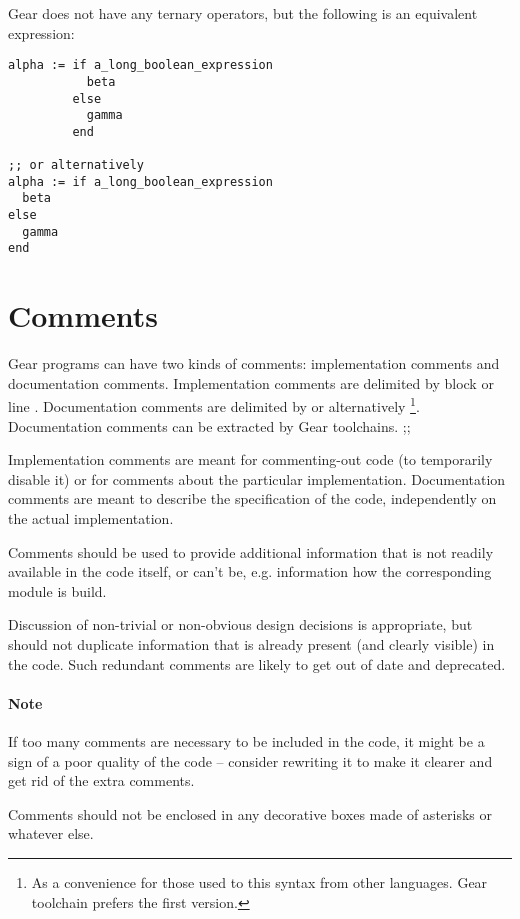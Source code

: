 \example Gear does not have any ternary operators, but the following is an equivalent expression:

\begin{lstlisting}
alpha := if a_long_boolean_expression
           beta
         else
           gamma
         end

;; or alternatively
alpha := if a_long_boolean_expression
  beta
else
  gamma
end
\end{lstlisting}





\section{Comments}

Gear programs can have two kinds of comments: implementation comments and documentation comments. Implementation comments are delimited by block \code{/* $\ \ldots$ */} or line \code{;;}. Documentation comments are delimited by \code{/*! $\ \ldots$ */} or alternatively \code{/** $\ \ldots$ */}\footnote{As a convenience for those used to this syntax from other languages. Gear toolchain prefers the first version.}. Documentation comments can be extracted by Gear toolchains. ;;

Implementation comments are meant for commenting-out code (to temporarily disable it) or for comments about the particular implementation. Documentation comments are meant to describe the specification of the code, independently on the actual implementation. 

Comments should be used to provide additional information that is not readily available in the code itself, or can't be, e.g. information how the corresponding module is build. 

Discussion of non-trivial or non-obvious design decisions is appropriate, but should not duplicate information that is already present (and clearly visible) in the code. Such redundant comments are likely to get out of date and deprecated. 

\paragraph{Note}
If too many comments are necessary to be included in the code, it might be a sign of a poor quality of the code -- consider rewriting it to make it clearer and get rid of the extra comments. 

Comments should not be enclosed in any decorative boxes made of asterisks or whatever else. 





